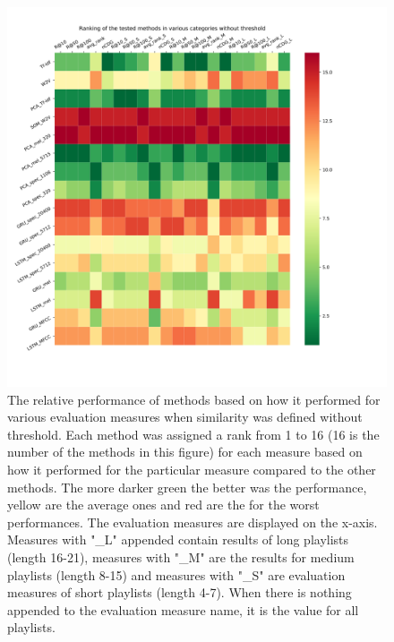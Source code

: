 \begin{figure}[h]
    \centering
	\includegraphics[width=1\linewidth]{./img/no_threshold_method_ranking.png}
	\caption[Method performance comparison heat map without threshold applied]{The relative performance of methods based on how it performed for various evaluation measures when similarity was defined without threshold. Each method was assigned a rank from 1 to 16 (16 is the number of the methods in this figure) for each measure based on how it performed for the particular measure compared to the other methods. The more darker green the better was the performance, yellow are the average ones and red are the for the worst performances. The evaluation measures are displayed on the x-axis. Measures with "\_L" appended contain results of long playlists (length 16-21), measures with "\_M" are the results for medium playlists (length 8-15) and measures with "\_S" are evaluation measures of short playlists (length 4-7). When there is nothing appended to the evaluation measure name, it is the value for all playlists.}
	\label{fig:no_threshold_method_comparison}
\end{figure}
